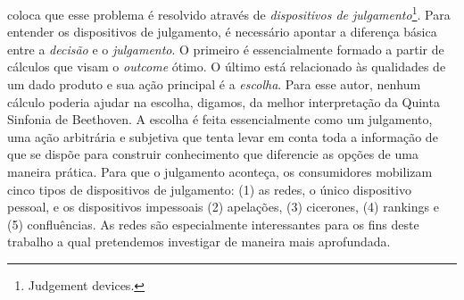 \documentclass[a4paper, 12pt, openright, oneside, german, french, english, brazil]{abntex2}
\begin{document}
	
	 coloca que esse problema é resolvido através de \textit{dispositivos de julgamento}\footnote{Judgement devices.}. Para entender os dispositivos de julgamento, é necessário apontar a diferença básica entre a \textit{decisão} e o \textit{julgamento}. O primeiro é essencialmente formado a partir de cálculos que visam o \textit{outcome} ótimo. O último está relacionado às qualidades de um dado produto e sua ação principal é a \textit{escolha}. Para esse autor, nenhum cálculo poderia ajudar na escolha, digamos, da melhor interpretação da Quinta Sinfonia de Beethoven. A escolha é feita essencialmente como um julgamento, uma ação arbitrária e subjetiva que tenta levar em conta toda a informação de que se dispõe para construir conhecimento que diferencie as opções de uma maneira prática. Para que o julgamento aconteça, os consumidores mobilizam cinco tipos de dispositivos de julgamento: (1) as redes, o único dispositivo pessoal, e os dispositivos impessoais (2) apelações, (3) cicerones, (4) rankings e (5) confluências. As redes são especialmente interessantes para os fins deste trabalho a qual pretendemos investigar de maneira mais aprofundada.
	
	
	
	
	
\end{document}
